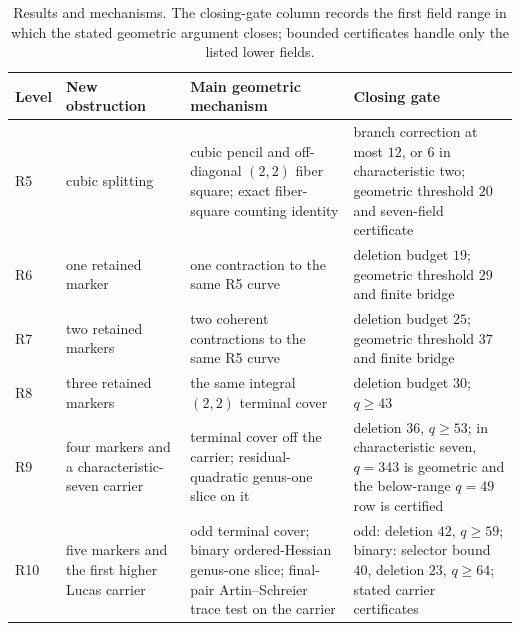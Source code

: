 \begin{table}[H]
\centering
\small
\caption{Results and mechanisms.  The closing-gate column records the first
field range in which the stated geometric argument closes; bounded
certificates handle only the listed lower fields.}
\label{tab:dependency-map}
\setlength{\tabcolsep}{3pt}
\begin{tabular}{p{}p{}p{}
                p{}}
\toprule
Level & New obstruction & Main geometric mechanism & Closing gate\\
\midrule
R5 & cubic splitting & cubic pencil and off-diagonal \((2,2)\) fiber square;
exact fiber-square counting identity & branch correction at most \(12\), or \(6\) in
characteristic two; geometric threshold \(20\) and seven-field certificate\\
R6 & one retained marker & one contraction to the same R5 curve & deletion
budget \(19\); geometric threshold \(29\) and finite bridge\\
R7 & two retained markers & two coherent contractions to the same R5 curve &
deletion budget \(25\); geometric threshold \(37\) and finite bridge\\
R8 & three retained markers & the same integral \((2,2)\) terminal cover &
deletion budget \(30\); \(q\geq43\)\\
R9 & four markers and a characteristic-seven carrier & terminal cover off
the carrier; residual-quadratic genus-one slice on it & deletion \(36\),
\(q\geq53\); in characteristic seven, \(q=343\) is geometric and the
below-range \(q=49\) row is certified\\
R10 & five markers and the first higher Lucas carrier & odd terminal cover;
binary ordered-Hessian genus-one slice; final-pair Artin--Schreier trace test
on the carrier & odd: deletion \(42\), \(q\geq59\); binary: selector bound
\(40\), deletion \(23\), \(q\geq64\); stated carrier certificates\\
\bottomrule
\end{tabular}
\end{table}

